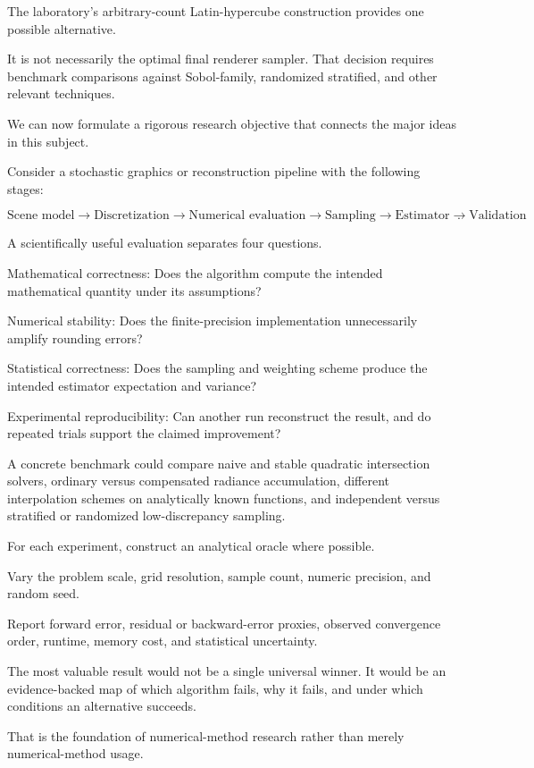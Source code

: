 The laboratory's arbitrary-count Latin-hypercube construction provides one possible alternative.

It is not necessarily the optimal final renderer sampler. That decision requires benchmark comparisons against Sobol-family, randomized stratified, and other relevant techniques.

We can now formulate a rigorous research objective that connects the major ideas in this subject.

Consider a stochastic graphics or reconstruction pipeline with the following stages:

\[ \boxed{ \text{Scene model} \rightarrow \text{Discretization} \rightarrow \text{Numerical evaluation} \rightarrow \text{Sampling} \rightarrow \text{Estimator} \rightarrow \text{Validation} }. \]

A scientifically useful evaluation separates four questions.

Mathematical correctness: Does the algorithm compute the intended mathematical quantity under its assumptions?

Numerical stability: Does the finite-precision implementation unnecessarily amplify rounding errors?

Statistical correctness: Does the sampling and weighting scheme produce the intended estimator expectation and variance?

Experimental reproducibility: Can another run reconstruct the result, and do repeated trials support the claimed improvement?

A concrete benchmark could compare naive and stable quadratic intersection solvers, ordinary versus compensated radiance accumulation, different interpolation schemes on analytically known functions, and independent versus stratified or randomized low-discrepancy sampling.

For each experiment, construct an analytical oracle where possible.

Vary the problem scale, grid resolution, sample count, numeric precision, and random seed.

Report forward error, residual or backward-error proxies, observed convergence order, runtime, memory cost, and statistical uncertainty.

The most valuable result would not be a single universal winner. It would be an evidence-backed map of which algorithm fails, why it fails, and under which conditions an alternative succeeds.

That is the foundation of numerical-method research rather than merely numerical-method usage.

